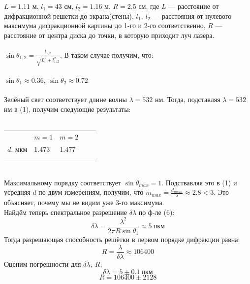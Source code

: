 \documentclass[a4paper]{article}
\begin{document}
$L=1.11$ м, $l_1=43$ см, $l_2=1.16$ м, $R=2.5$ см, где $L$ --- расстояние от дифракционной решетки до экрана(стены),
$l_1,~l_2$ --- расстояния от нулевого максимума дифракционной картины до 1-го и 2-го соответственно, $R$ --- расстояние
от центра диска до точки, в которую приходит луч лазера.\\
\\
$\sin\theta_{1,2}=\displaystyle\frac{l_{1,2}}{\sqrt{L^2+l_{1,2}^2}}$. В таком случае получим, что:\\
\\
$\sin\theta_1\approx0.36,~\sin\theta_2\approx0.72$\\\
\\
Зелёный свет соответствует длине волны $\lambda=532$ нм. Тогда, подставляя $\lambda=532$ нм в (1), получим следующие результаты:
\\
\\
\begin{tabular}{lllll}
\cline{1-3}
\multicolumn{1}{|l|}{}  & \multicolumn{1}{l|}{$m=1$}   & \multicolumn{1}{l|}{$m=2$}   &  &  \\ \cline{1-3}
\multicolumn{1}{|l|}{$d$, мкм} & \multicolumn{1}{l|}{1.473} & \multicolumn{1}{l|}{1.477} &  &  \\ \cline{1-3}
                        &                            &                            &  &  \\
                        &                            &                            &  &
\end{tabular}
\\
Максимальному порядку соответствует $\sin\theta_{max}=1$. Подствавляя это в (1) и усредняя $d$ по двум измерениям,
получим, что $m_{max}=\displaystyle\frac{d_{mean}}{\lambda}\approx2.8<3$. Это объясняет,
почему мы не видим уже 3-го максимума.\\
Найдём теперь  спектральное разрешение $\delta\lambda$ по ф-ле (6):
\begin{equation}\label{eq7}
\delta\lambda=\displaystyle\frac{\lambda^2}{2\pi R\sin\theta_1}\approx5~пкм
\end{equation}
Тогда разрешающая способность решётки в первом порядке дифракции равна:
\begin{equation}\label{eq8}
R=\displaystyle\frac{\lambda}{\delta\lambda}\approx106400
\end{equation}
Оценим погрешности для $\delta\lambda,~R$:
    $$ \delta\lambda=5\pm 0.1~пкм$$
    $$ R=106400\pm2128 $$
\end{document}
